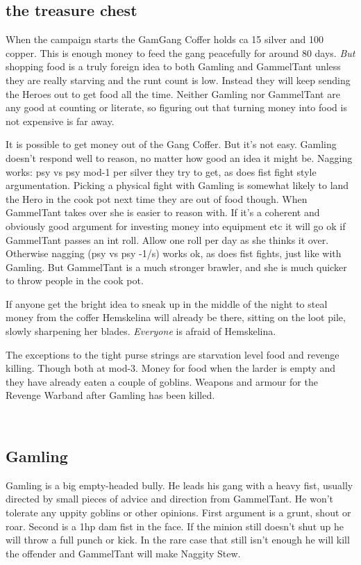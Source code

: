 \subsection*{the treasure chest}

When the campaign starts the GamGang Coffer holds ca 15 silver and 100 copper. This is enough money to feed the gang peacefully for around 80 days. \emph{But} shopping food is a truly foreign idea to both Gamling and GammelTant unless they are really starving and the runt count is low. Instead they will keep sending the Heroes out to get food all the time. Neither Gamling nor GammelTant are any good at counting or literate, so figuring out that turning money into food is not expensive is far away.

It is possible to get money out of the Gang Coffer. But it's not easy. Gamling doesn't respond well to reason, no matter how good an idea it might be. Nagging works: psy vs psy mod-1 per silver they try to get, as does fist fight style argumentation. Picking a physical fight with Gamling is somewhat likely to land the Hero in the cook pot next time they are out of food though. When GammelTant takes over she is easier to reason with. If it's a coherent and obviously good argument for investing money into equipment etc it will go ok if GammelTant passes an int roll. Allow one roll per day as she thinks it over. Otherwise nagging (psy vs psy -1/s) works ok, as does fist fights, just like with Gamling. But GammelTant is a much stronger brawler, and she is much quicker to throw people in the cook pot.

If anyone get the bright idea to sneak up in the middle of the night to steal money from the coffer Hemskelina will already be there, sitting on the loot pile, slowly sharpening her blades. \emph{Everyone} is afraid of Hemskelina.

The exceptions to the tight purse strings are starvation level food and revenge killing. Though both at mod-3. Money for food when the larder is empty and they have already eaten a couple of goblins. Weapons and armour for the Revenge Warband after Gamling has been killed.

\


\goodbreak 
\subsection*{Gamling}

Gamling is a big empty-headed bully. He leads his gang with a heavy fist, usually directed by small pieces of advice and direction from GammelTant. He won't tolerate any uppity goblins or other opinions. First argument is a grunt, shout or roar. Second is a 1hp dam fist in the face. If the minion still doesn't shut up he will throw a full punch or kick. In the rare case that still isn't enough he will kill the offender and GammelTant will make Naggity Stew.


